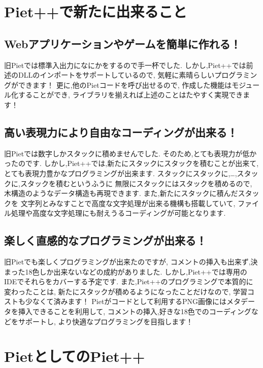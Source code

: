 \section{Piet++で新たに出来ること}

\subsection{Webアプリケーションやゲームを簡単に作れる！}

旧Pietでは標準入出力になにかをするので手一杯でした.
しかし,Piet++では前述のDLLのインポートをサポートしているので,
気軽に素晴らしいプログラミングができます！
更に,他のPietコードを呼び出せるので,
作成した機能はモジュール化することができ,
ライブラリを揃えれば上述のことはたやすく実現できます！

\subsection{高い表現力により自由なコーディングが出来る！}

旧Pietでは数字しかスタックに積めませんでした.
そのため,とても表現力が低かったのです.
しかし,Piet++では,新たにスタックにスタックを積むことが出来て,
とても表現力豊かなプログラミングが出来ます.
スタックにスタックに,\ldots{},スタックに,スタックを積むというふうに
無限にスタックにはスタックを積めるので,
木構造のようなデータ構造も再現できます.
また,新たにスタックに積んだスタックを
文字列とみなすことで高度な文字処理が出来る機構も搭載していて,
ファイル処理や高度な文字処理にも耐えうるコーディングが可能となります.

\subsection{楽しく直感的なプログラミングが出来る！}

旧Pietでも楽しくプログラミングが出来たのですが,
コメントの挿入も出来ず,決まった18色しか出来ないなどの成約がありました.
しかし,Piet++では専用のIDEでそれらをカバーする予定です.
また,Piet++のプログラミングで本質的に変わったことは,
新たにスタックが積めるようになったことだけなので,
学習コストも少なくて済みます！
Pietがコードとして利用するPNG画像にはメタデータを挿入できることを利用して,
コメントの挿入,好きな18色でのコーディングなどをサポートし,
より快適なプログラミングを目指します！

\section{PietとしてのPiet++}


